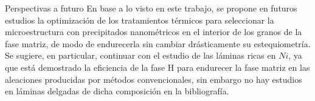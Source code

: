 \documentclass[11pt]{beamer}
\begin{document}
	\begin{frame}{Perspectivas a futuro}
En base a lo visto en este trabajo, se propone en futuros estudios la optimización de los tratamientos térmicos para seleccionar la microestructura con precipitados nanométricos en el interior de los granos de la fase matriz, de modo de endurecerla sin cambiar drásticamente su estequiometría. Se sugiere, en particular, continuar con el estudio de las láminas ricas en $Ni$, ya que está demostrado la eficiencia de la fase H para endurecer la fase matriz en las aleaciones producidas por métodos convencionales, sin embargo no hay estudios en láminas delgadas de dicha composición en la bibliografía.	
\end{frame}
\end{document}
